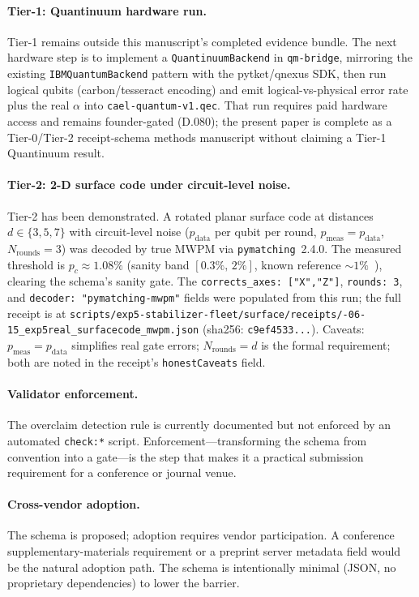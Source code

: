 \documentclass[conference]{IEEEtran}
\newcommand{\af}{\alpha}            %
\begin{document}
\paragraph{Tier-1: Quantinuum hardware run.}
Tier-1 remains outside this manuscript's completed evidence bundle. The
next hardware step is to implement a \texttt{QuantinuumBackend} in
\texttt{qm-bridge}, mirroring the existing \texttt{IBMQuantumBackend}
pattern with the pytket/qnexus SDK, then run logical qubits
(carbon/tesseract encoding) and emit logical-vs-physical error rate plus
the real $\af$ into \texttt{cael-quantum-v1.qec}. That run requires paid
hardware access and remains founder-gated (D.080); the present paper is
complete as a Tier-0/Tier-2 receipt-schema methods manuscript without
claiming a Tier-1 Quantinuum result.

\paragraph{Tier-2: 2-D surface code under circuit-level noise.}
Tier-2 has been demonstrated.  A rotated planar surface code at distances
$d \in \{3,5,7\}$ with circuit-level noise ($p_{\mathrm{data}}$ per qubit per
round, $p_{\mathrm{meas}} = p_{\mathrm{data}}$, $N_{\mathrm{rounds}}=3$) was
decoded by true MWPM via \texttt{pymatching}~2.4.0.  The measured threshold
is $p_c \approx 1.08\%$ (sanity band $[0.3\%,\,2\%]$, known reference $\sim
1\%$~\cite{fowler2012surface}), clearing the schema's sanity gate.  The
\texttt{corrects\_axes: ["X","Z"]}, \texttt{rounds: 3}, and \texttt{decoder:
"pymatching-mwpm"} fields were populated from this run; the full receipt is
at \texttt{scripts/exp5-stabilizer-fleet/surface/receipts/-06-15\_exp5real\_surfacecode\_mwpm.json} (sha256:
\texttt{c9ef4533...}).  Caveats: $p_{\mathrm{meas}} = p_{\mathrm{data}}$
simplifies real gate errors; $N_{\mathrm{rounds}} = d$ is the formal
requirement; both are noted in the receipt's \texttt{honestCaveats} field.

\paragraph{Validator enforcement.}
The overclaim detection rule is currently documented but not enforced by
an automated \texttt{check:*} script. Enforcement---transforming the
schema from convention into a gate---is the step that makes it a
practical submission requirement for a conference or journal venue.

\paragraph{Cross-vendor adoption.}
The schema is proposed; adoption requires vendor participation. A
conference supplementary-materials requirement or a preprint server
metadata field would be the natural adoption path. The schema is
intentionally minimal (JSON, no proprietary dependencies) to lower the
barrier.
\end{document}
